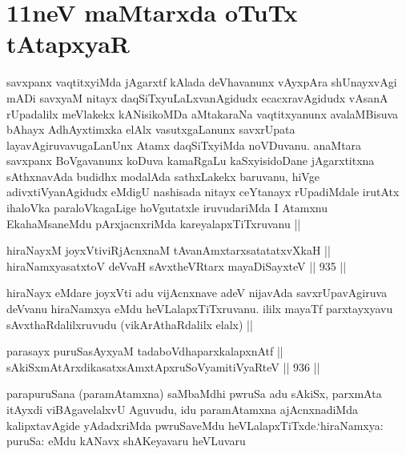 \section*{11neV maMtarxda oTuTx tAtapxyaR}

\begin{artha}
savxpanx vaqtitxyiMda jAgarxtf kAlada deVhavanunx vAyxpAra shUnayxvAgi mADi savxyaM nitayx daqSiTxyuLaLxvanAgidudx ecacxravAgidudx vAsanA rUpadalilx meVlakekx kANisikoMDa aMtakaraNa vaqtitxyanunx avalaMBisuva bAhayx AdhAyxtimxka elAlx vasutxgaLanunx savxrUpata layavAgiruvavugaLanUnx Atamx daqSiTxyiMda noVDuvanu. anaMtara savxpanx BoVgavanunx koDuva kamaRgaLu kaSxyisidoDane jAgarxtitxna sAthxnavAda budidhx modalAda sathxLakekx baruvanu, hiVge adivxtiVyanAgidudx eMdigU nashisada nitayx ceYtanayx rUpadiMdale irutAtx ihaloVka paraloVkagaLige hoVgutatxle iruvudariMda I Atamxnu EkahaMsaneMdu pArxjacnxriMda kareyalapxTiTxruvanu ||
\end{artha}


\begin{shl}
hiraNayxM joyxVtiviRjAcnxnaM tAvanAmxtarxsatatatxvXkaH || \\
hiraNamxyasatxtoV deVvaH sAvxtheVR\s tarx mayaDiSayxteV ||  935 ||  
\end{shl}

\begin{artha}
hiraNayx eMdare joyxVti adu vijAcnxnave adeV nijavAda savxrUpavAgiruva deVvanu hiraNamxya eMdu heVLalapxTiTxruvanu. ililx mayaTf parxtayxyavu sAvxthaRdalilxruvudu (vikArAthaRdalilx elalx) ||
\end{artha}


\begin{shl}
parasayx puruSasAyxyaM tadaboVdhaparxkalapxnAtf || \\
sAkiSxmAtArxdikasatxsAmxtApxruSoV\s yamitiVyaRteV ||  936 ||  
\end{shl}

\begin{artha}
parapuruSana (paramAtamxna) saMbaMdhi pwruSa adu sAkiSx, parxmAta itAyxdi viBAgavelalxvU Aguvudu, idu paramAtamxna ajAcnxnadiMda kalipxtavAgide yAdadxriMda pwruSaveMdu heVLalapxTiTxde.`hiraNamxya: puruSa: eMdu kANavx shAKeyavaru heVLuvaru
\end{artha}

